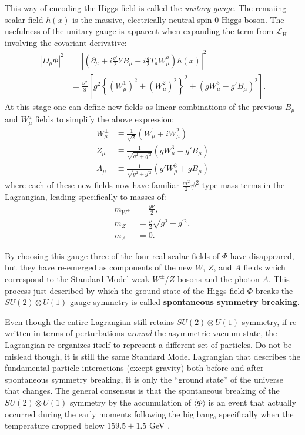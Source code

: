 This way of encoding the Higgs field is called the \textit{unitary gauge}.
The remaiing scalar field $h(x)$ is the massive, electrically neutral spin-0 Higgs boson. %
The usefulness of the unitary gauge is apparent when expanding the term from $\mathcal{L}_{\mathrm{H}}$ involving the covariant derivative:
\begin{align}
    \left|D_\mu \Phi\right|^2 &= \left| \left( \partial_\mu + i \frac{g'}{2} Y B_\mu + i \frac{g}{2} T_a W_\mu^a \right) h(x) \right|^2 \\
    &= \frac{\nu^2}{8} \left[
     g^2 \left\{ (W^1_\mu)^2 + (W_\mu^2)^2 \right\}^2 + (gW^3_\mu - g' B_\mu)^2
    \right].
\end{align}
At this stage one can define new fields as linear combinations of the previous $B_\mu$ and $W^a_\mu$ fields to simplify the above expression:
\begin{align}
    W_\mu^\pm &\equiv \frac{1}{\sqrt{2}} \left( W^1_\mu \mp i W^2_\mu \right) \\
    Z_\mu &\equiv \frac{1}{\sqrt{g^2 + g^{\prime 2}}} \left( g W^3_\mu - g' B_\mu \right) \\
    A_\mu &\equiv \frac{1}{\sqrt{g^2 + g^{\prime 2}}} \left( g' W^3_\mu + g B_\mu \right)
\end{align}
where each of these new fields now have familiar $\frac{m^2}{2}\psi^2$-type mass terms in the Lagrangian, leading specifically to masses of:
\begin{align}
    m_{W^\pm} &= \frac{g\nu}{2}, \\
    m_{Z} &= \frac{\nu}{2}\sqrt{g^2 + g^{\prime 2}}, \\
    m_{A} &= 0.
\end{align}

By choosing this gauge three of the four real scalar fields of $\Phi$ have disappeared, but they have re-emerged as components of the new $W$, $Z$, and $A$ fields which correspond to the Standard Model weak $W^\pm$/$Z$ bosons and the photon $A$.
This process just described by which the ground state of the Higgs field $\Phi$ breaks the $SU(2) \otimes U(1)$ gauge symmetry is called \textbf{spontaneous symmetry breaking}.

Even though the entire Lagrangian still retains $SU(2) \otimes U(1)$ symmetry, if re-written in terms of perturbations \textit{around} the asymmetric vacuum state, the Lagrangian re-organizes itself to represent a different set of particles.
Do not be mislead though, it is still the same Standard Model Lagrangian that describes the fundamental particle interactions (except gravity) both before and after spontaneous symmetry breaking, it is only the ``ground state'' of the universe that changes.
The general consensus is that the spontaneous breaking of the $SU(2) \otimes U(1)$ symmetry by the accumulation of $\langle \Phi \rangle$ is an event that actually occurred during the early moments following the big bang, specifically when the temperature dropped below $159.5 \pm 1.5$ GeV \cite{DOnofrio:2015gop}.


